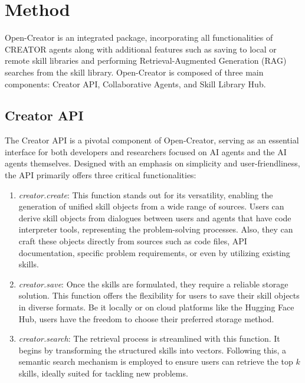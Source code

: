 \section{Method}


Open-Creator is an integrated package, incorporating all functionalities of CREATOR agents along with additional features such as saving to local or remote skill libraries and performing Retrieval-Augmented Generation (RAG) searches from the skill library. Open-Creator is composed of three main components: Creator API, Collaborative Agents, and Skill Library Hub.

\subsection{Creator API}

The Creator API is a pivotal component of Open-Creator, serving as an essential interface for both developers and researchers focused on AI agents and the AI agents themselves. Designed with an emphasis on simplicity and user-friendliness, the API primarily offers three critical functionalities:
\begin{enumerate}
    \item \textit{creator.create}: This function stands out for its versatility, enabling the generation of unified skill objects from a wide range of sources. Users can derive skill objects from dialogues between users and agents that have code interpreter tools, representing the problem-solving processes. Also, they can craft these objects directly from sources such as code files, API documentation, specific problem requirements, or even by utilizing existing skills.

    \item \textit{creator.save}: Once the skills are formulated, they require a reliable storage solution. This function offers the flexibility for users to save their skill objects in diverse formats. Be it locally or on cloud platforms like the Hugging Face Hub, users have the freedom to choose their preferred storage method.

    \item \textit{creator.search}: The retrieval process is streamlined with this function. It begins by transforming the structured skills into vectors. Following this, a semantic search mechanism is employed to ensure users can retrieve the top \( k \) skills, ideally suited for tackling new problems.
\end{enumerate}


